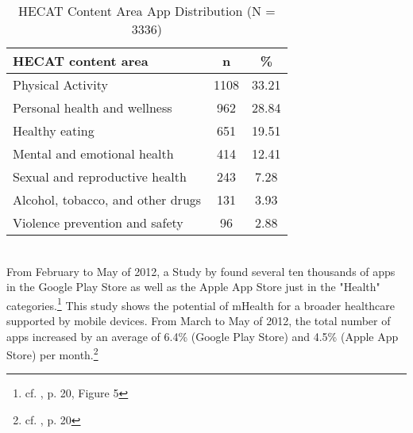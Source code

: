 \begin{table}[!htb]
    \center
    \begin{tabular}{l | c | c}
        \textbf{HECAT content area} & \textbf{n} & \textbf{\%}\footnotemark \\
        \hline
        Physical Activity & 1108 & 33.21 \\
        \hline
        Personal health and wellness & 962 & 28.84 \\
        \hline
        Healthy eating & 651 & 19.51 \\
        \hline
        Mental and emotional health & 414 & 12.41 \\
        \hline
        Sexual and reproductive health & 243 & 7.28 \\
        \hline
        Alcohol, tobacco, and other drugs & 131 & 3.93 \\
        \hline
        Violence prevention and safety & 96 & 2.88 \\
    \end{tabular}
    \caption[HECAT Content Area App Distribution]{HECAT Content Area App Distribution (N = 3336)\footnotemark}
    \label{tab:HECAT}
\end{table}
\addtocounter{footnote}{-1}
\addtocounter{footnote}{1}
\\
From February to May of 2012, a Study by \cite{dHeureuse.2012} found several ten thousands of apps in the Google Play Store as well as the Apple App Store just in the "Health" categories.\footnote{cf. \cite{dHeureuse.2012}, p. 20, Figure 5} This study shows the potential of mHealth for a broader healthcare supported by mobile devices. From March to May of 2012, the total number of apps increased by an average of 6.4\% (Google Play Store) and 4.5\% (Apple App Store) per month.\footnote{cf. \cite{dHeureuse.2012}, p. 20}

